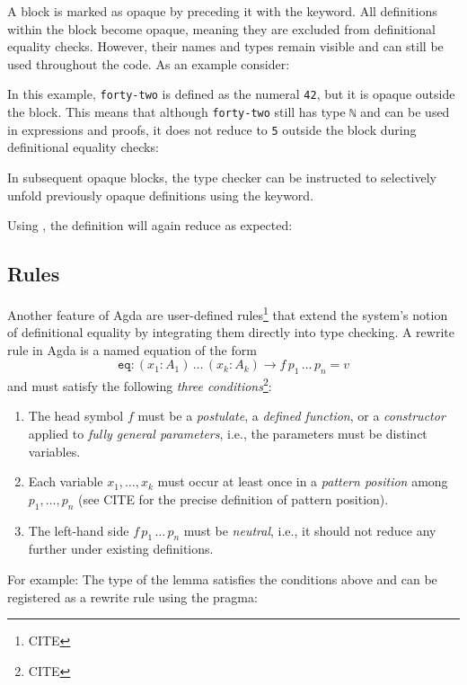 \documentclass[screen,nonacm]{acmart}
\begin{document}
A block is marked as opaque by preceding it with the 
keyword. All definitions within the block become opaque, meaning they are
excluded from definitional equality checks. However, their names and types
remain visible and can still be used throughout the code. As an example
consider: \EOpaque{}

In this example, \verb|forty-two| is defined as the numeral \verb|42|, but it
is opaque outside the block. This means that although \verb|forty-two| still
has type \verb|ℕ| and can be used in expressions and proofs, it does not reduce
to \verb|5| outside the block during definitional equality checks: \EOpaqueExO

In subsequent opaque blocks, the type checker can be instructed to selectively
unfold previously opaque definitions using the  keyword.

Using , the definition will again reduce as expected:
\EOpaqueExT{}

\subsection*{ Rules}

Another feature of Agda are user-defined 
rules\footnote{CITE} that extend the system’s notion of definitional equality
by integrating them directly into type checking. A rewrite rule in Agda is a
named equation of the form
\[
      \texttt{eq} : (x_1 : A_1)\, \ldots\, (x_k : A_k) \to f\, p_1\, \ldots\, p_n = v
\]
and must satisfy the following \emph{three conditions}\footnote{CITE}:
\begin{enumerate}
      \item The head symbol $f$ must be a \emph{postulate}, a \emph{defined function}, or a
            \emph{constructor} applied to \emph{fully general parameters}, i.e., the
            parameters must be distinct variables.
      \item Each variable $x_1, \ldots, x_k$ must occur at least once in a \emph{pattern
                  position} among $p_1, \ldots, p_n$ (see CITE for the precise definition of
            pattern position).
      \item The left-hand side $f\, p_1\, \ldots\, p_n$ must be \emph{neutral}, i.e., it
            should not reduce any further under existing definitions.
\end{enumerate}

For example: \ERewrite{} The type of the lemma satisfies the conditions above
and can be registered as a rewrite rule using the  pragma:
\ERewriteIt{}
\end{document}
